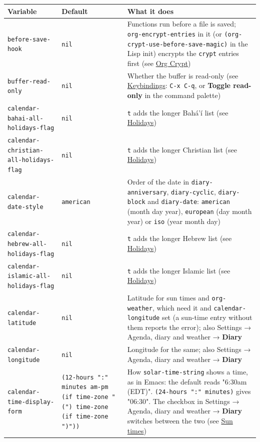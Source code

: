 \documentclass[11pt]{article}
\begin{document}
\begin{center}
\begin{tabular}{lll}
Variable & Default & What it does\\[0pt]
\hline
\texttt{before-save-hook} & \texttt{nil} & Functions run before a file is saved; \texttt{org-encrypt-entries} in it (or \texttt{(org-crypt-use-before-save-magic)} in the Lisp init) encrypts the \texttt{crypt} entries first (see \hyperref[sec:orgf01cffd]{Org Crypt})\\[0pt]
\texttt{buffer-read-only} & \texttt{nil} & Whether the buffer is read-only (see \hyperref[sec:orga8a12f7]{Keybindings}: \texttt{C-x C-q}, or \textbf{Toggle read-only} in the command palette)\\[0pt]
\texttt{calendar-bahai-all-holidays-flag} & \texttt{nil} & \texttt{t} adds the longer Bahá'í list (see \hyperref[sec:orgf9fd27a]{Holidays})\\[0pt]
\texttt{calendar-christian-all-holidays-flag} & \texttt{nil} & \texttt{t} adds the longer Christian list (see \hyperref[sec:orgf9fd27a]{Holidays})\\[0pt]
\texttt{calendar-date-style} & \texttt{american} & Order of the date in \texttt{diary-anniversary}, \texttt{diary-cyclic}, \texttt{diary-block} and \texttt{diary-date}: \texttt{american} (month day year), \texttt{european} (day month year) or \texttt{iso} (year month day)\\[0pt]
\texttt{calendar-hebrew-all-holidays-flag} & \texttt{nil} & \texttt{t} adds the longer Hebrew list (see \hyperref[sec:orgf9fd27a]{Holidays})\\[0pt]
\texttt{calendar-islamic-all-holidays-flag} & \texttt{nil} & \texttt{t} adds the longer Islamic list (see \hyperref[sec:orgf9fd27a]{Holidays})\\[0pt]
\texttt{calendar-latitude} & \texttt{nil} & Latitude for sun times and \texttt{org-weather}, which need it and \texttt{calendar-longitude} set (a sun-time entry without them reports the error); also Settings → Agenda, diary and weather → \textbf{Diary}\\[0pt]
\texttt{calendar-longitude} & \texttt{nil} & Longitude for the same; also Settings → Agenda, diary and weather → \textbf{Diary}\\[0pt]
\texttt{calendar-time-display-form} & \texttt{(12-hours ":" minutes am-pm (if time-zone " (") time-zone (if time-zone ")"))} & How \texttt{solar-time-string} shows a time, as in Emacs: the default reads "6:30am (EDT)". \texttt{(24-hours ":" minutes)} gives "06:30". The checkbox in Settings → Agenda, diary and weather → \textbf{Diary} switches between the two (see \hyperref[sec:org88a17f5]{Sun times})\\[0pt]

\end{tabular}
\end{center}
\end{document}

